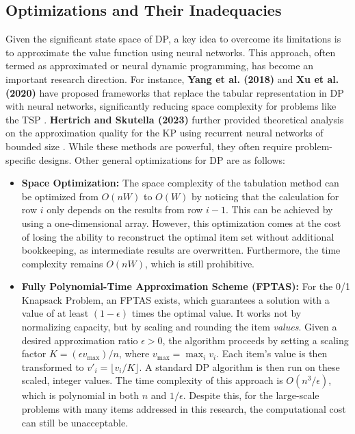 \subsection{Optimizations and Their Inadequacies}

Given the significant state space of DP, a key idea to overcome its limitations is to approximate the value function using neural networks. This approach, often termed as approximated or neural dynamic programming, has become an important research direction. For instance, \textbf{Yang et al. (2018)} and \textbf{Xu et al. (2020)} have proposed frameworks that replace the tabular representation in DP with neural networks, significantly reducing space complexity for problems like the TSP \cite{yangBoostingDynamicProgramming2018, xuDeepNeuralNetwork2020}. \textbf{Hertrich and Skutella (2023)} further provided theoretical analysis on the approximation quality for the KP using recurrent neural networks of bounded size \cite{hertrichProvablyGoodSolutions2023}. While these methods are powerful, they often require problem-specific designs. Other general optimizations for DP are as follows:

\begin{itemize}
    \item \textbf{Space Optimization:} The space complexity of the tabulation method can be optimized from \(O(nW)\) to \(O(W)\) by noticing that the calculation for row \(i\) only depends on the results from row \(i-1\).
This can be achieved by using a one-dimensional array. However, this optimization comes at the cost of losing the ability to reconstruct the optimal item set without additional bookkeeping, as intermediate results are overwritten.
Furthermore, the time complexity remains \(O(nW)\), which is still prohibitive.
\item \textbf{Fully Polynomial-Time Approximation Scheme (FPTAS):} For the 0/1 Knapsack Problem, an FPTAS exists, which guarantees a solution with a value of at least \((1-\epsilon)\) times the optimal value.
It works not by normalizing capacity, but by scaling and rounding the item \textit{values}.
Given a desired approximation ratio \(\epsilon > 0\), the algorithm proceeds by setting a scaling factor \(K = (\epsilon v_{\max}) / n\), where \(v_{\max} = \max_{i} v_i\).
Each item's value is then transformed to \(v'_i = \lfloor v_i / K \rfloor\).
A standard DP algorithm is then run on these scaled, integer values.
The time complexity of this approach is \(O(n^3/\epsilon)\), which is polynomial in both \(n\) and \(1/\epsilon\).
Despite this, for the large-scale problems with many items addressed in this research, the computational cost can still be unacceptable.
\end{itemize}

